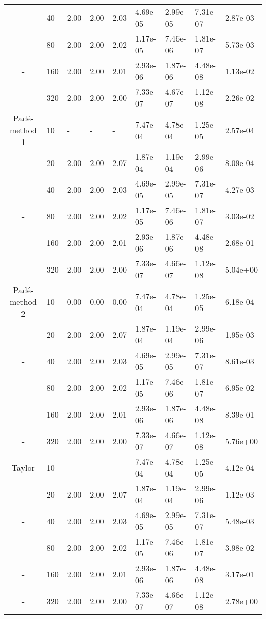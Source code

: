\begin{table}[htbp]
{\begin{tabular}{cllllllll}
     - &          40 & 2.00 & 2.00 & 2.03 & 4.69e-05 & 2.99e-05 & 7.31e-07 & 2.87e-03 \\ 
     - &          80 & 2.00 & 2.00 & 2.02 & 1.17e-05 & 7.46e-06 & 1.81e-07 & 5.73e-03 \\ 
     - &         160 & 2.00 & 2.00 & 2.01 & 2.93e-06 & 1.87e-06 & 4.48e-08 & 1.13e-02 \\ 
     - &         320 & 2.00 & 2.00 & 2.00 & 7.33e-07 & 4.67e-07 & 1.12e-08 & 2.26e-02 \\
   \hline
   Pad\'e-method 1 & 10 & - & - & - & 7.47e-04 & 4.78e-04 & 1.25e-05 & 2.57e-04 \\ 
    - &             20 & 2.00 & 2.00 & 2.07 & 1.87e-04 & 1.19e-04 & 2.99e-06 & 8.09e-04 \\ 
    - &             40 & 2.00 & 2.00 & 2.03 & 4.69e-05 & 2.99e-05 & 7.31e-07 & 4.27e-03 \\ 
    - &             80 & 2.00 & 2.00 & 2.02 & 1.17e-05 & 7.46e-06 & 1.81e-07 & 3.03e-02 \\ 
    - &            160 & 2.00 & 2.00 & 2.01 & 2.93e-06 & 1.87e-06 & 4.48e-08 & 2.68e-01 \\ 
    - &            320 & 2.00 & 2.00 & 2.00 & 7.33e-07 & 4.66e-07 & 1.12e-08 & 5.04e+00 \\ 
   \hline
    Pad\'e-method 2 & 10 & 0.00 & 0.00 & 0.00 & 7.47e-04 & 4.78e-04 & 1.25e-05 & 6.18e-04 \\ 
    - &               20 & 2.00 & 2.00 & 2.07 & 1.87e-04 & 1.19e-04 & 2.99e-06 & 1.95e-03 \\ 
    - &               40 & 2.00 & 2.00 & 2.03 & 4.69e-05 & 2.99e-05 & 7.31e-07 & 8.61e-03 \\ 
    - &               80 & 2.00 & 2.00 & 2.02 & 1.17e-05 & 7.46e-06 & 1.81e-07 & 6.95e-02 \\ 
    - &              160 & 2.00 & 2.00 & 2.01 & 2.93e-06 & 1.87e-06 & 4.48e-08 & 8.39e-01 \\ 
    - &              320 & 2.00 & 2.00 & 2.00 & 7.33e-07 & 4.66e-07 & 1.12e-08 & 5.76e+00 \\
   \hline
   Taylor & 10 & - & - & - & 7.47e-04 & 4.78e-04 & 1.25e-05 & 4.12e-04 \\ 
   - &      20 & 2.00 & 2.00 & 2.07 & 1.87e-04 & 1.19e-04 & 2.99e-06 & 1.12e-03 \\ 
   - &      40 & 2.00 & 2.00 & 2.03 & 4.69e-05 & 2.99e-05 & 7.31e-07 & 5.48e-03 \\ 
   - &      80 & 2.00 & 2.00 & 2.02 & 1.17e-05 & 7.46e-06 & 1.81e-07 & 3.98e-02 \\ 
   - &     160 & 2.00 & 2.00 & 2.01 & 2.93e-06 & 1.87e-06 & 4.48e-08 & 3.17e-01 \\ 
   - &     320 & 2.00 & 2.00 & 2.00 & 7.33e-07 & 4.66e-07 & 1.12e-08 & 2.78e+00 \\
   \hline
   \end{tabular}
   }
\end{table}

